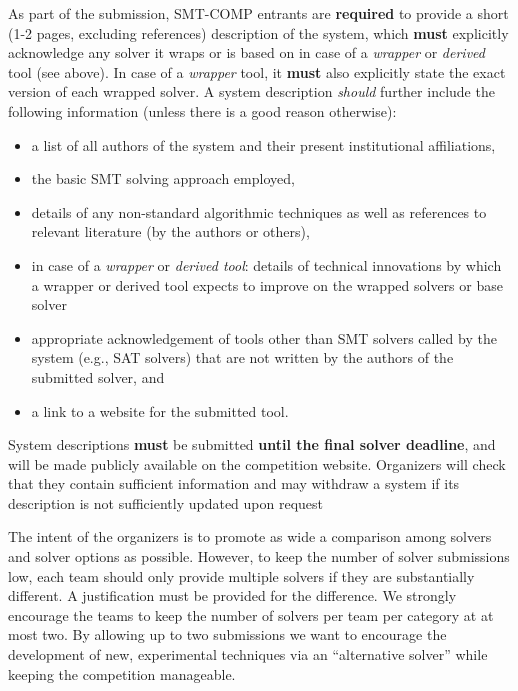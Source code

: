 \documentclass[12pt]{article}
\begin{document}
%
As part of the submission, SMT-COMP entrants are \textbf{required} to provide a
short (1-2 pages, excluding references) description of the system, which \textbf{must} explicitly
acknowledge any solver it wraps or is based on in case of a \emph{wrapper} or
\emph{derived} tool (see above).
In case of a \emph{wrapper} tool, it \textbf{must} also explicitly state
the exact version of each wrapped solver.
A system description \emph{should} further include the following information
(unless there is a good reason otherwise):
\begin{itemize}[itemsep=0ex]
  \item a list of all authors of the system and their present institutional
    affiliations,
  \item the basic SMT solving approach employed,
  \item details of any non-standard algorithmic techniques as well as
    references to relevant literature (by the authors or others),
  \item in case of a \emph{wrapper} or \emph{derived tool}: details of
    technical innovations by which a wrapper or derived tool expects to improve
    on the wrapped solvers or base solver
  \item appropriate acknowledgement of tools other than SMT solvers called by
    the system (e.g., SAT solvers) that are not written by the authors of the
    submitted solver, and
  \item a link to a website for the submitted tool.
\end{itemize}
System descriptions \textbf{must} be submitted \textbf{until the final solver
deadline}, and will be made publicly available on the competition website.
Organizers will check that they contain sufficient information
and may withdraw a system if its description is not sufficiently updated upon
request

%
The intent of the organizers is to promote as wide a comparison among
solvers and solver options as possible.  However, to keep the number of
solver submissions low, each team should only provide multiple solvers
if they are  substantially different.  A justification must be provided
for the difference.  We strongly encourage the teams to keep the number
of solvers per team per category at at most two. By allowing
up to two submissions we want to encourage the development of new,
experimental techniques via an ``alternative solver'' while keeping
the competition manageable.
\end{document}
